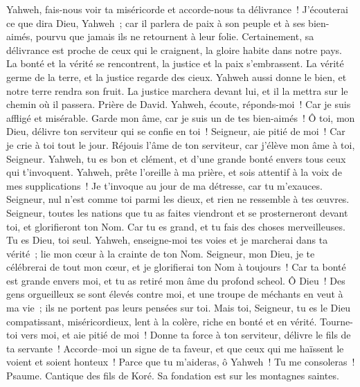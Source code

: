 \begin{multicols}{2}
Yahweh, fais-nous voir ta miséricorde et accorde-nous ta délivrance~!
J'écouterai ce que dira Dieu, Yahweh~; car il parlera de paix à son peuple et à ses bien-aimés, pourvu que jamais ils ne retournent à leur folie.
Certainement, sa délivrance est proche de ceux qui le craignent, la gloire habite dans notre pays.
La bonté et la vérité se rencontrent, la justice et la paix s'embrassent.
La vérité germe de la terre, et la justice regarde des cieux.
Yahweh aussi donne le bien, et notre terre rendra son fruit.
La justice marchera devant lui, et il la mettra sur le chemin où il passera.
\VerseOne{}Prière de David. Yahweh, écoute, réponds-moi~! Car je suis affligé et misérable.
Garde mon âme, car je suis un de tes bien-aimés~! Ô toi, mon Dieu, délivre ton serviteur qui se confie en toi~!
Seigneur, aie pitié de moi~! Car je crie à toi tout le jour.
Réjouis l'âme de ton serviteur, car j'élève mon âme à toi, Seigneur.
Yahweh, tu es bon et clément, et d'une grande bonté envers tous ceux qui t'invoquent.
Yahweh, prête l'oreille à ma prière, et sois attentif à la voix de mes supplications~!
Je t'invoque au jour de ma détresse, car tu m'exauces.
Seigneur, nul n'est comme toi parmi les dieux, et rien ne ressemble à tes œuvres.
Seigneur, toutes les nations que tu as faites viendront et se prosterneront devant toi, et glorifieront ton Nom.
Car tu es grand, et tu fais des choses merveilleuses. Tu es Dieu, toi seul.
Yahweh, enseigne-moi tes voies et je marcherai dans ta vérité~; lie mon cœur à la crainte de ton Nom.
Seigneur, mon Dieu, je te célébrerai de tout mon cœur, et je glorifierai ton Nom à toujours~!
Car ta bonté est grande envers moi, et tu as retiré mon âme du profond scheol.
Ô Dieu~! Des gens orgueilleux se sont élevés contre moi, et une troupe de méchants en veut à ma vie~; ils ne portent pas leurs pensées sur toi.
Mais toi, Seigneur, tu es le Dieu compatissant, miséricordieux, lent à la colère, riche en bonté et en vérité.
Tourne-toi vers moi, et aie pitié de moi~! Donne ta force à ton serviteur, délivre le fils de ta servante~!
Accorde–moi un signe de ta faveur, et que ceux qui me haïssent le voient et soient honteux~! Parce que tu m'aideras, ô Yahweh~! Tu me consoleras~!
\VerseOne{}Psaume. Cantique des fils de Koré. Sa fondation est sur les montagnes saintes.

\end{multicols}
